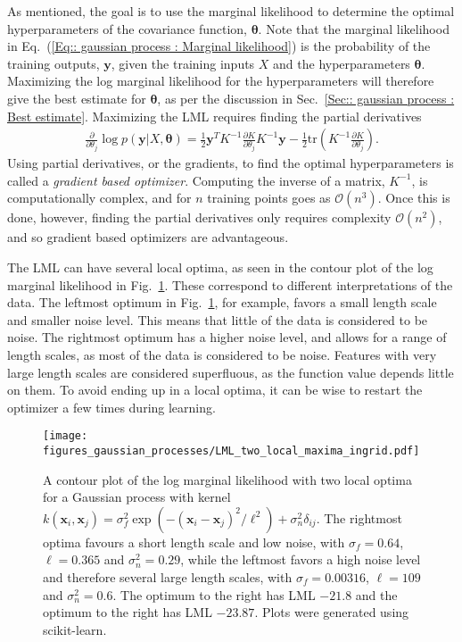 \documentclass[twoside,english]{uiofysmaster}
\begin{document}
{As mentioned, the goal is to use the marginal likelihood to determine the optimal hyperparameters of the covariance function, $\boldsymbol{\theta}$. Note that the marginal likelihood in Eq.~(\ref{Eq:: gaussian process : Marginal likelihood}) is the probability of the training outputs, $\textbf{y}$, given the training inputs $X$ and the hyperparameters $\boldsymbol{\theta}$. Maximizing the log marginal likelihood for the hyperparameters will therefore give the best estimate for $\boldsymbol{\theta}$, as per the discussion in Sec.~\ref{Sec:: gaussian process : Best estimate}. Maximizing the LML requires finding the partial derivatives 
\begin{align}
\frac{\partial}{\partial \theta_j}
 \log p(\textbf{y}|X, \boldsymbol{\theta}) = \frac{1}{2} \textbf{y}^T K^{-1} \frac{\partial K}{\partial \theta_j} K^{-1} \textbf{y} - \frac{1}{2} \text{tr} (K^{-1} \frac{\partial K}{\partial \theta_j}).
\end{align}
Using partial derivatives, or the gradients, to find the optimal hyperparameters is called a \textit{gradient based optimizer}. Computing the inverse of a matrix, $K^{-1}$, is computationally complex, and for $n$ training points goes as $\mathcal{O}(n^3)$. Once this is done, however, finding the partial derivatives only requires complexity $\mathcal{O}(n^2)$, and so gradient based optimizers are advantageous.

The LML can have several local optima, as seen in the contour plot of the log marginal likelihood in Fig.~\ref{Fig:: gaussian process : LML several local optima}. These correspond to different interpretations of the data. The leftmost optimum in Fig.~\ref{Fig:: gaussian process : LML several local optima}, for example, favors a small length scale and smaller noise level. This means that little of the data is considered to be noise. The rightmost optimum has a higher noise level, and allows for a range of length scales, as most of the data is considered to be noise. Features with very large length scales are considered superfluous, as the function value depends little on them. To avoid ending up in a local optima, it can be wise to restart the optimizer a few times during learning.

\begin{figure}
\centering
\texttt{[image: figures\_gaussian\_processes/LML\_two\_local\_maxima\_ingrid.pdf]}
\caption{A contour plot of the log marginal likelihood with two local optima for a Gaussian process with kernel $k(\textbf{x}_i, \textbf{x}_j) = \sigma_f^2 \exp(- (\textbf{x}_i - \textbf{x}_j)^2 / \ell^2) + \sigma_n^2 \delta_{ij}$. The rightmost optima favours a short length scale and low noise, with $\sigma_f = 0.64$, $\ell = 0.365$ and $\sigma^2_n = 0.29$, while the leftmost favors a high noise level and therefore several large length scales, with $\sigma_f = 0.00316$, $\ell = 109$ and $\sigma^2_n = 0.6$. The optimum to the right has LML $-21.8$ and the optimum to the right has LML $-23.87$. Plots were generated using scikit-learn.}
\label{Fig:: gaussian process : LML several local optima}
\end{figure}


}
\end{document}
